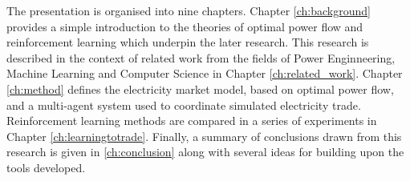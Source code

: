 The presentation is organised into nine chapters.  Chapter \ref{ch:background}
provides a simple introduction to the theories of optimal power flow and
reinforcement learning which underpin the later research.  This research
is described in the context of related work from the fields of Power
Enginneering, Machine Learning and Computer Science in Chapter
\ref{ch:related_work}.  Chapter \ref{ch:method} defines the electricity market
model, based on optimal power flow, and a multi-agent system used to
coordinate simulated electricity trade.  Reinforcement learning methods are
compared in a series of experiments in Chapter \ref{ch:learningtotrade}.
Finally, a summary of conclusions drawn from this research is given in
\ref{ch:conclusion} along with several ideas for building upon the tools
developed.




